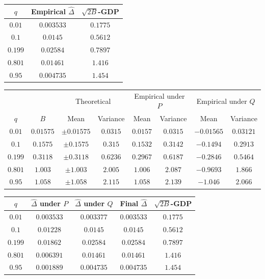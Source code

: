 \begin{tabular}{c c c}
\toprule
$q$  & Empirical $\widehat{\Delta}$ & $\sqrt{2B}$-GDP \\
\midrule
$0.01$   & $0.003533$ & $0.1775$ \\
$0.1$   & $0.0145$ & $0.5612$ \\
$0.199$   & $0.02584$ & $0.7897$ \\
$0.801$   & $0.01461$ & $1.416$ \\
$0.95$   & $0.004735$ & $1.454$ \\
\bottomrule
\end{tabular}

\begin{tabular}{c c cc cc cc}
\toprule
 & & \multicolumn{2}{c}{Theoretical} & \multicolumn{2}{c}{Empirical under $P$} & \multicolumn{2}{c}{Empirical under $Q$} \\
\cmidrule(lr){3-4}\cmidrule(lr){5-6}\cmidrule(lr){7-8}
$q$ & $B$ & Mean & Variance & Mean & Variance & Mean & Variance \\
\midrule
$0.01$ & $0.01575$ & $\pm0.01575$ & $0.0315$ & $0.0157$ & $0.0315$ & $-0.01565$ & $0.03121$ \\
$0.1$ & $0.1575$ & $\pm0.1575$ & $0.315$ & $0.1532$ & $0.3142$ & $-0.1494$ & $0.2913$ \\
$0.199$ & $0.3118$ & $\pm0.3118$ & $0.6236$ & $0.2967$ & $0.6187$ & $-0.2846$ & $0.5464$ \\
$0.801$ & $1.003$ & $\pm1.003$ & $2.005$ & $1.006$ & $2.087$ & $-0.9693$ & $1.866$ \\
$0.95$ & $1.058$ & $\pm1.058$ & $2.115$ & $1.058$ & $2.139$ & $-1.046$ & $2.066$ \\
\bottomrule
\end{tabular}

\begin{tabular}{c c cc c}
\toprule
$q$ & $\widehat{\Delta}$ under $P$ & $\widehat{\Delta}$ under $Q$ & Final $\widehat{\Delta}$ & $\sqrt{2B}$-GDP \\
\midrule
$0.01$ & $0.003533$ & $0.003377$ & $0.003533$ & $0.1775$ \\
$0.1$ & $0.01228$ & $0.0145$ & $0.0145$ & $0.5612$ \\
$0.199$ & $0.01862$ & $0.02584$ & $0.02584$ & $0.7897$ \\
$0.801$ & $0.006391$ & $0.01461$ & $0.01461$ & $1.416$ \\
$0.95$ & $0.001889$ & $0.004735$ & $0.004735$ & $1.454$ \\
\bottomrule
\end{tabular}


